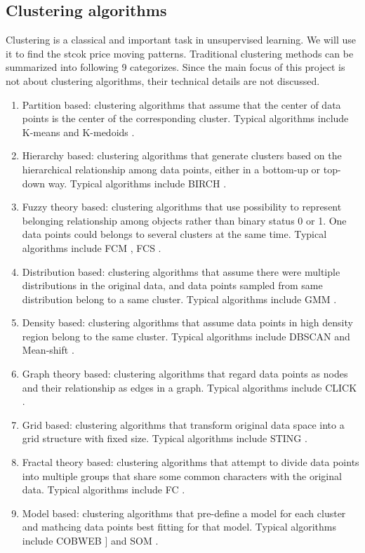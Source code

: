 \subsection{Clustering algorithms}
Clustering is a classical and important task in unsupervised learning. We will use it to find the stcok price moving patterns. Traditional clustering methods can be summarized into following 9 categorizes. Since the main focus of this project is not about clustering algorithms, their technical details are not discussed.
\begin{enumerate}
    \item Partition based: clustering algorithms that assume that the center of data points is the center of the corresponding cluster. Typical algorithms include K-means \cite{macqueen1967some} and K-medoids \cite{park2009simple}.
    \item Hierarchy based: clustering algorithms that generate clusters based on the hierarchical relationship among data points, either in a bottom-up or top-down way. Typical algorithms include BIRCH \cite{zhang1996birch}.
    \item Fuzzy theory based: clustering algorithms that use possibility to represent belonging relationship among objects rather than binary status 0 or 1. One data points could belongs to several clusters at the same time. Typical algorithms include FCM \cite{bezdek1984fcm}, FCS \cite{dave1992adaptive}.
    \item Distribution based: clustering algorithms that assume there were multiple distributions in the original data, and data points sampled from same distribution belong to a same cluster. Typical algorithms include GMM \cite{rasmussen1999infinite}.
    \item Density based: clustering algorithms that assume data points in high density region belong to the same cluster. Typical algorithms include DBSCAN \cite{ester1996density} and Mean-shift \cite{comaniciu2002mean}.
    \item Graph theory based: clustering algorithms that regard data points as nodes and their relationship as edges in a graph. Typical algorithms include CLICK \cite{sharan2000click}.
    \item Grid based: clustering algorithms that transform original data space into a grid structure with fixed size. Typical algorithms include STING \cite{wang1997sting}.
    \item Fractal theory based: clustering algorithms that attempt to divide data points into multiple groups that share some common characters with the original data. Typical algorithms include FC \cite{barbara2000using}.
    \item Model based: clustering algorithms that pre-define a model for each cluster and mathcing data points best fitting for that model. Typical algorithms include COBWEB ]\cite{fisher1987knowledge} and SOM \cite{kohonen1990self}.
\end{enumerate}

